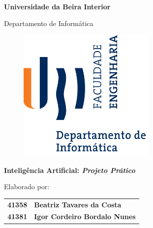 
\thispagestyle{empty}
\setcounter{page}{-1}

\begin{center}
\begin{Huge}
\textbf{Universidade da Beira Interior}
\end{Huge}
\end{center}

\begin{center}
\begin{Huge}
Departamento de Informática
\end{Huge}
\end{center}

\vspace{0,07cm}
\begin{figure}[!htb]
\centering
\includegraphics[width=191pt]{ubi-fe-di.png}
\end{figure}

\vspace{0.5cm}
\begin{center}
\begin{Large}
\textbf{Inteligência Artificial: \emph{Projeto Prático}}
\end{Large}
\end{center}


\vspace{0.5cm}
\begin{center}
\begin{normalsize}
\begin{large}
Elaborado por:
\end{large}
\end{normalsize}
\end{center}

\vspace{0.2cm}
\begin{center}
\begin{large}
\begin{tabular}{>{\bfseries}r @{~~---~~} >{\bfseries}l}
	41358 & Beatriz Tavares da Costa    \\
	41381 & Igor Cordeiro Bordalo Nunes
\end{tabular}
\end{large}
\end{center}

